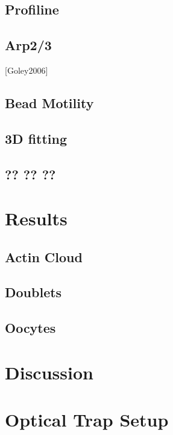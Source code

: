 \documentclass[A4paperpaper,11pt,english]{sphinxmanual}
\begin{document}
\section{Profiline}
\label{parts/part2:profiline}

\section{Arp2/3}
\label{parts/part2:arp2-3}
{[}Goley2006{]}


\section{Bead Motility}
\label{parts/part2:bead-motility}

\section{3D fitting}
\label{parts/part2:d-fitting}

\section{?? ?? ??}
\label{parts/part2:id2}

\chapter{Results}
\label{parts/part3::doc}\label{parts/part3:results}

\section{Actin Cloud}
\label{parts/part3:actin-cloud}

\section{Doublets}
\label{parts/part3:doublets}

\section{Oocytes}
\label{parts/part3:oocytes}

\chapter{Discussion}
\label{parts/part4:discussion}\label{parts/part4::doc}

\chapter{Optical Trap Setup}
\label{parts/physicalparameters:physicalparameters}\label{parts/physicalparameters::doc}\label{parts/physicalparameters:optical-trap-setup}
\end{document}
